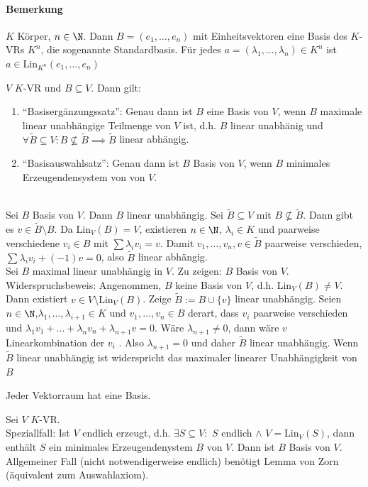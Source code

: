\paragraph{Bemerkung} $K$ Körper, $n\in \N$. Dann $B=(e_1,\dots, e_n)$ mit Einheitsvektoren eine Basis des $K$-VRs $K^n$, die sogenannte Standardbasis. Für jedes $a=(\lambda_1,\dots,\lambda_n) \in K^n$ ist $a\in \mathrm{Lin}_{K^n}(e_1,\dots, e_n)$
\begin{theorem}
	$V$ $K$-VR und $B\subseteq V$. Dann gilt:
	\begin{enumerate}
		\item ``Basisergänzungssatz'': Genau dann ist $B$ eine Basis von $V$, wenn $B$ maximale linear unabhängige Teilmenge von $V$ ist, d.h. $B$ linear unabhänig und $\forall \tilde{B}\subseteq V: B \not\subseteq\tilde{B}\implies \tilde{B}$ linear abhängig.
		\item ``Basisauswahlsatz'': Genau dann ist $B$ Basis von $V$, wenn $B$ minimales Erzeugendensystem von von $V$.
	\end{enumerate}
\end{theorem}
\prove \ \\Sei $B$ Basis von $V$. Dann $B$ linear unabhängig. Sei $\tilde{B}\subseteq V$ mit $B\not\subseteq \tilde{B}$. Dann gibt es $v\in\tilde{B}\setminus B$. Da $\mathrm{Lin}_V(B)=V$, existieren $n\in \N$, $\lambda_i\in K$ und paarweise verschiedene $v_i\in B$ mit $\sum \lambda_iv_i= v$. Damit $v_1, \dots, v_n, v \in \tilde{B}$ paarweise verschieden, $\sum \lambda_iv_i+(-1)v=0$, also $\tilde{B}$ linear abhängig.\\
Sei $B$ maximal linear unabhängig in $V$. Zu zeigen: $B$ Basis von $V$. Widerspruchsbeweis: Angenommen, $B$ keine Basis von $V$, d.h. $\mathrm{Lin}_V(B)\neq V$. Dann existiert $v\in V\setminus\mathrm{Lin}_V(B)$. Zeige $\tilde{B}:=B\cup \{v\}$ linear unabhängig. Seien $n\in \N$,$\lambda_1, \dots, \lambda_{i+1}\in K$ und $v_1, \dots, v_n \in B$ derart, dass $v_i$ paarweise verschieden und $\lambda_1v_1+\dots+\lambda_nv_n+\lambda_{n+1}v=0$. Wäre $\lambda_{n+1}\neq 0$, dann wäre $v$ Linearkombination der $v_i$ \lightning. Also $\lambda_{n+1}=0$ und daher $\tilde{B}$ linear unabhängig. Wenn $\tilde{B}$ linear unabhängig ist widerspricht das maximaler linearer Unabhängigkeit von $B$ \lightning
\begin{theorem}
	Jeder Vektorraum hat eine Basis.
\end{theorem}
\prove Sei $V$ $K$-VR.\\
Speziallfall: Ist $V$ endlich erzeugt, d.h. $\exists S \subseteq V:$ $S$ endlich $\land$ $V=\mathrm{Lin}_V(S)$, dann enthält $S$ ein minimales Erzeugendenystem $B$ von $V$. Dann ist $B$ Basis von $V$. Allgemeiner Fall (nicht notwendigerweise endlich) benötigt Lemma von Zorn (äquivalent zum Auswahlaxiom).

